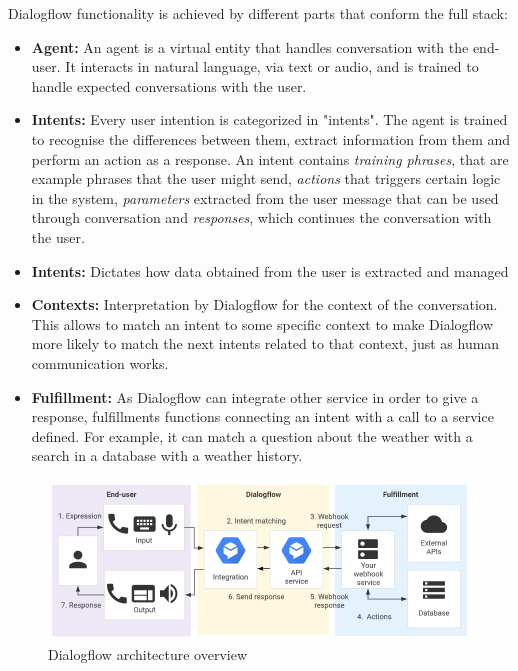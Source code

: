 Dialogflow functionality is achieved by different parts that conform the full stack:
\begin{itemize}
    \item \textbf{Agent:} An agent is a virtual entity that handles conversation with the end-user. It interacts in natural language, via text or audio, and is trained to handle expected conversations with the user.
    \item \textbf{Intents:} Every user intention is categorized in "intents". The agent is trained to recognise the differences between them, extract information from them and perform an action as a response. An intent contains \textsl{training phrases}, that are example phrases that the user might send, \textsl{actions} that triggers certain logic in the system, \textsl{parameters} extracted from the user message that can be used through conversation and \textsl{responses}, which continues the conversation with the user. 
    \item \textbf{Intents:} Dictates how data obtained from the user is extracted and managed
    \item \textbf{Contexts:} Interpretation by Dialogflow for the context of the conversation. This allows to match an intent to some specific context to make Dialogflow more likely to match the next intents related to that context, just as human communication works.
    \item \textbf{Fulfillment:} As Dialogflow can integrate other service in order to give a response, fulfillments functions connecting an intent with a call to a service defined. For example, it can match a question about the weather with a search in a database with a weather history.
\end{itemize}
\begin{figure}[ht]
\includegraphics[scale=0.5]{docs/img/project_pics/dialogflow.png}
\centering
\caption{Dialogflow architecture overview \cite{dialogflow_overview}}
\end{figure}

